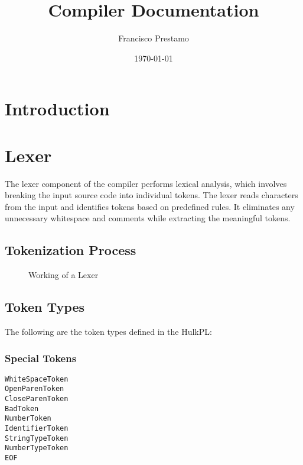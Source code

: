 \documentclass{article}
\begin{document}
\title{Compiler Documentation}
\author{Francisco Prestamo}
\date{\today}

\maketitle
\newpage
\tableofcontents
\newpage

\section{Introduction}


\newpage

\section{Lexer}

The lexer component of the compiler performs lexical analysis, which involves breaking the input source code into individual tokens. The lexer reads characters from the input and identifies tokens based on predefined rules. It eliminates any unnecessary whitespace and comments while extracting the meaningful tokens.

\subsection{Tokenization Process}

\begin{figure}[H]
\centering
{}
\caption{Working of a Lexer}
\end{figure}

\subsection{Token Types}
The following are the token types defined in the HulkPL:
\subsubsection{Special Tokens}
\begin{lstlisting}
WhiteSpaceToken
OpenParenToken
CloseParenToken
BadToken
NumberToken
IdentifierToken
StringTypeToken
NumberTypeToken
EOF
\end{lstlisting}
\end{document}
